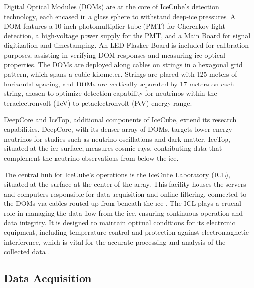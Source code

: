 
Digital Optical Modules (DOMs) are at the core of IceCube’s detection technology, each encased in a glass sphere to withstand deep-ice pressures.
A DOM features a 10-inch photomultiplier tube (PMT) for Cherenkov light detection, a high-voltage power supply for the PMT, and a Main Board for signal digitization and timestamping.
An LED Flasher Board is included for calibration purposes, assisting in verifying DOM responses and measuring ice optical properties.
The DOMs are deployed along cables on strings in a hexagonal grid pattern, which spans a cubic kilometer.
Strings are placed with 125 meters of horizontal spacing, and DOMs are vertically separated by 17 meters on each string, chosen to optimize detection capability for neutrinos within the teraelectronvolt (TeV) to petaelectronvolt (PeV) energy range.

DeepCore and IceTop, additional components of IceCube, extend its research capabilities.
DeepCore, with its denser array of DOMs, targets lower energy neutrinos for studies such as neutrino oscillations and dark matter.
IceTop, situated at the ice surface, measures cosmic rays, contributing data that complement the neutrino observations from below the ice.


The central hub for IceCube's operations is the IceCube Laboratory (ICL), situated at the surface at the center of the array.
This facility houses the servers and computers responsible for data acquisition and online filtering, connected to the DOMs via cables routed up from beneath the ice \cite{IC3_thedetector}.
The ICL plays a crucial role in managing the data flow from the ice, ensuring continuous operation and data integrity.
It is designed to maintain optimal conditions for its electronic equipment, including temperature control and protection against electromagnetic interference, which is vital for the accurate processing and analysis of the collected data \cite{IC3_thedetector}.


\subsection{Data Acquisition}

